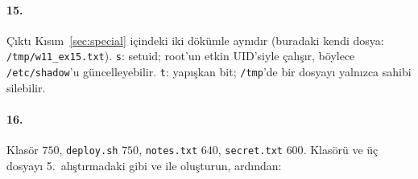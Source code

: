 \paragraph{15.} Çıktı Kısım~\ref{sec:special} içindeki iki dökümle aynıdır (buradaki kendi dosya: \texttt{/tmp/w11\_ex15.txt}). \texttt{s}: setuid;  root'un etkin UID'siyle çalışır, böylece \texttt{/etc/shadow}'u güncelleyebilir. \texttt{t}: yapışkan bit; \texttt{/tmp}'de bir dosyayı yalnızca sahibi silebilir.

\paragraph{16.} Klasör $750$, \texttt{deploy.sh} $750$, \texttt{notes.txt} $640$, \texttt{secret.txt} $600$. Klasörü ve üç dosyayı 5.~alıştırmadaki gibi  ve  ile oluşturun, ardından:

